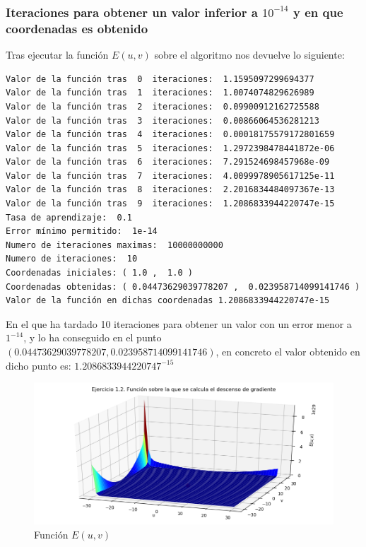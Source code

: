 \documentclass[12pt, spanish]{article}
\begin{document}
\newpage

\subsubsection{Iteraciones para obtener un valor inferior a $10^{-14}$  y en que coordenadas es obtenido}

Tras ejecutar la función $E(u,v)$ sobre el algoritmo nos devuelve lo siguiente:

\begin{lstlisting}
Valor de la función tras  0  iteraciones:  1.1595097299694377
Valor de la función tras  1  iteraciones:  1.0074074829626989
Valor de la función tras  2  iteraciones:  0.09900912162725588
Valor de la función tras  3  iteraciones:  0.00866064536281213
Valor de la función tras  4  iteraciones:  0.00018175579172801659
Valor de la función tras  5  iteraciones:  1.2972398478441872e-06
Valor de la función tras  6  iteraciones:  7.291524698457968e-09
Valor de la función tras  7  iteraciones:  4.0099978905617125e-11
Valor de la función tras  8  iteraciones:  2.2016834484097367e-13
Valor de la función tras  9  iteraciones:  1.2086833944220747e-15
Tasa de aprendizaje:  0.1
Error mínimo permitido:  1e-14
Numero de iteraciones maximas:  10000000000
Numero de iteraciones:  10
Coordenadas iniciales: ( 1.0 ,  1.0 )
Coordenadas obtenidas: ( 0.04473629039778207 ,  0.023958714099141746 )
Valor de la función en dichas coordenadas 1.2086833944220747e-15

\end{lstlisting}

En el que ha tardado 10 iteraciones para obtener un valor con un error menor a $1^{-14}$, y lo ha conseguido en el punto $( 0.04473629039778207 ,  0.023958714099141746 )$, en concreto el valor obtenido en dicho punto es:  $1.2086833944220747^{-15}$

\newpage

\begin{figure}[H]
  \centering
      \includegraphics[scale = 0.70]{ej1-2.png}
 		 \caption{Función $E(u,v)$}
  		\label{fig:ej1-2}

\end{figure}
\end{document}
